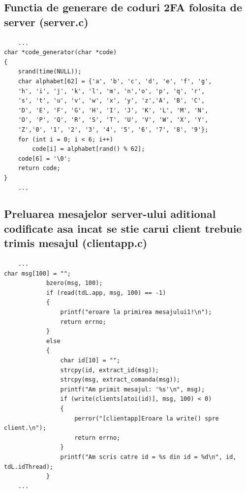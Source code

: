 \documentclass[runningheads]{llncs}
\begin{document}
\subsection{Functia de generare de coduri 2FA folosita de server (server.c)}
	\begin{verbatim}
	...
char *code_generator(char *code)
{
	srand(time(NULL));
	char alphabet[62] = {'a', 'b', 'c', 'd', 'e', 'f', 'g',
	'h', 'i', 'j', 'k', 'l', 'm', 'n','o', 'p', 'q', 'r',
	's', 't', 'u', 'v', 'w', 'x', 'y', 'z','A', 'B', 'C',
	'D', 'E', 'F', 'G', 'H', 'I', 'J', 'K', 'L', 'M', 'N',
	'O', 'P', 'Q', 'R', 'S', 'T', 'U', 'V', 'W', 'X', 'Y',
	'Z','0', '1', '2', '3', '4', '5', '6', '7', '8', '9'};
	for (int i = 0; i < 6; i++)
		code[i] = alphabet[rand() % 62];
	code[6] = '\0';
	return code;
}
    ...
\end{verbatim}
\subsection{Preluarea mesajelor server-ului aditional codificate asa incat se stie carui client trebuie trimis mesajul (clientapp.c)}
	\begin{verbatim}
	...
char msg[100] = "";
			bzero(msg, 100);
			if (read(tdL.app, msg, 100) == -1)
			{
				printf("eroare la primirea mesajului1!\n");
				return errno;
			}
			else
			{
				char id[10] = "";
				strcpy(id, extract_id(msg));
				strcpy(msg, extract_comanda(msg));
				printf("Am primit mesajul: '%s'\n", msg);
				if (write(clients[atoi(id)], msg, 100) < 0)
				{
					perror("[clientapp]Eroare la write() spre client.\n");
					return errno;
				}
				printf("Am scris catre id = %s din id = %d\n", id, tdL.idThread);
			}
	...
\end{verbatim}
\end{document}
